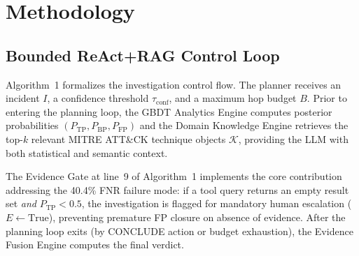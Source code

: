 \section{Methodology}
\label{sec:method}

\subsection{Bounded ReAct+RAG Control Loop}

Algorithm~1 formalizes the investigation control flow. The planner receives an
incident $I$, a confidence threshold $\tau_{\text{conf}}$, and a maximum hop
budget $B$. Prior to entering the planning loop, the GBDT Analytics Engine
computes posterior probabilities $(P_{\text{TP}}, P_{\text{BP}}, P_{\text{FP}})$
and the Domain Knowledge Engine retrieves the top-$k$ relevant MITRE ATT\&CK
technique objects $\mathcal{K}$, providing the LLM with both statistical and
semantic context.

The Evidence Gate at line~9 of Algorithm~1 implements the core contribution
addressing the 40.4\% FNR failure mode: if a tool query returns an empty result
set \emph{and} $P_{\text{TP}} < 0.5$, the investigation is flagged for mandatory
human escalation ($E \leftarrow \text{True}$), preventing premature FP closure
on absence of evidence. After the planning loop exits (by CONCLUDE action or
budget exhaustion), the Evidence Fusion Engine computes the final verdict.

